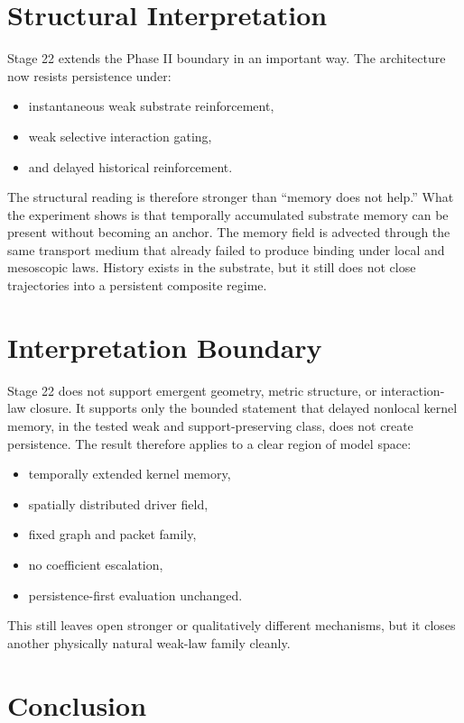 \documentclass[11pt]{article}
\begin{document}
\section{Structural Interpretation}

Stage 22 extends the Phase II boundary in an important way. The architecture now resists persistence under:
\begin{itemize}
\item instantaneous weak substrate reinforcement,
\item weak selective interaction gating,
\item and delayed historical reinforcement.
\end{itemize}

The structural reading is therefore stronger than ``memory does not help.'' What the experiment shows is that temporally accumulated substrate memory can be present without becoming an anchor. The memory field is advected through the same transport medium that already failed to produce binding under local and mesoscopic laws. History exists in the substrate, but it still does not close trajectories into a persistent composite regime.

\section{Interpretation Boundary}

Stage 22 does not support emergent geometry, metric structure, or interaction-law closure. It supports only the bounded statement that delayed nonlocal kernel memory, in the tested weak and support-preserving class, does not create persistence. The result therefore applies to a clear region of model space:
\begin{itemize}
\item temporally extended kernel memory,
\item spatially distributed driver field,
\item fixed graph and packet family,
\item no coefficient escalation,
\item persistence-first evaluation unchanged.
\end{itemize}

This still leaves open stronger or qualitatively different mechanisms, but it closes another physically natural weak-law family cleanly.

\section{Conclusion}
\end{document}
